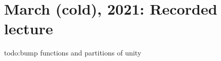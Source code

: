 \section{March (cold), 2021: Recorded lecture} 
{\color{red}todo:bump functions and partitions of unity} 
